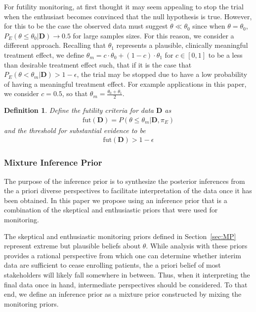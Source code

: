 \documentclass[12pt]{article}
\newtheorem{mydef}{Definition}
\begin{document}
For futility monitoring, at first thought it may seem appealing to stop the trial when the enthusiast becomes convinced that the
null hypothesis is true. 
%
However, for this to be the case the observed data must suggest $\theta \ll \theta_0$ since when $\theta=\theta_0$,
$P_E(\theta\le\theta_0| \mathbf{D}) \rightarrow 0.5$ for large samples sizes.
%
For this reason, we consider a different approach.
%
Recalling that $\theta_1$ represents a plausible, clinically meaningful treatment effect, we define $\theta_{m}= c \cdot \theta_0 + (1-c) \cdot \theta_1$ for 
$c \in [0,1]$ to be a less than desirable treatment effect such, that if it is the case that $P_E\left(\theta<\theta_{m}| \mathbf{D}\right)>1-\epsilon$, 
the trial may be stopped due to have a low probability of having a meaningful treatment effect.
%
For example applications in this paper, we consider $c=0.5$, so that $\theta_m=\frac{\theta_0+\theta_1}{2}$.

\begin{mydef}
Define the futility criteria for data $\mathbf{D}$ as
\begin{align}
\text{fut}(\mathbf{D})=P\left(\theta\leq\theta_m \Big|\mathbf{D},\pi_E\right)
\end{align}
and the threshold for substantial evidence to be
\begin{align}
\text{fut}(\mathbf{D})>1-\epsilon
\end{align}
\end{mydef}

\subsubsection{Mixture Inference Prior}
The purpose of the inference prior is to synthesize the posterior inferences from the a priori diverse perspectives to facilitate interpretation of the data once it has been obtained. In this paper we propose using an inference prior that is a combination of the skeptical and enthusiastic priors that were used for monitoring.

The skeptical and enthusiastic monitoring priors defined in Section~\ref{sec:MP} represent extreme but plausible beliefs about $\theta$.
%
While analysis with these priors provides a rational perspective from which one can determine whether interim data are sufficient 
to cease enrolling patients, the a priori belief of most stakeholders will likely fall somewhere in between.
%
Thus, when it interpreting the final data once in hand, intermediate perspectives should be considered.
%
To that end, we define an inference prior as a mixture prior constructed by mixing the monitoring priors.
\end{document}
